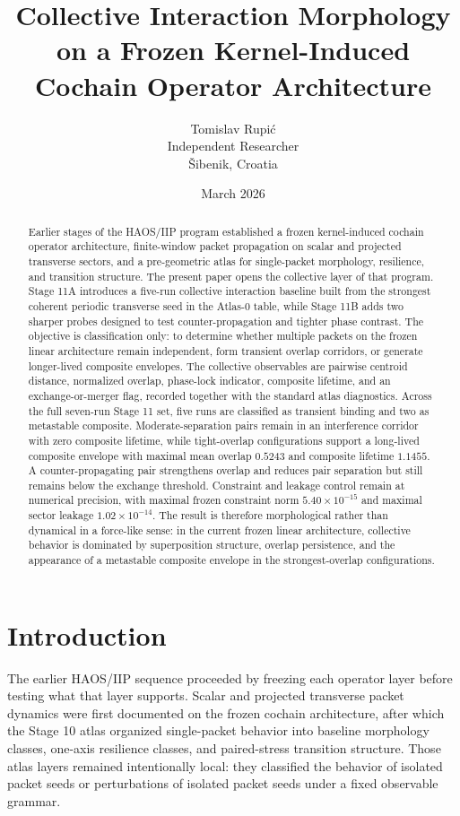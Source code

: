 \documentclass[11pt]{article}
\title{Collective Interaction Morphology on a Frozen Kernel-Induced Cochain Operator Architecture}
\author{Tomislav Rupi\'c\\Independent Researcher\\\v{S}ibenik, Croatia}
\date{March 2026}
\begin{document}
\maketitle

\begin{abstract}
Earlier stages of the HAOS/IIP program established a frozen kernel-induced cochain operator architecture, finite-window packet propagation on scalar and projected transverse sectors, and a pre-geometric atlas for single-packet morphology, resilience, and transition structure. The present paper opens the collective layer of that program. Stage 11A introduces a five-run collective interaction baseline built from the strongest coherent periodic transverse seed in the Atlas-0 table, while Stage 11B adds two sharper probes designed to test counter-propagation and tighter phase contrast. The objective is classification only: to determine whether multiple packets on the frozen linear architecture remain independent, form transient overlap corridors, or generate longer-lived composite envelopes. The collective observables are pairwise centroid distance, normalized overlap, phase-lock indicator, composite lifetime, and an exchange-or-merger flag, recorded together with the standard atlas diagnostics. Across the full seven-run Stage 11 set, five runs are classified as transient binding and two as metastable composite. Moderate-separation pairs remain in an interference corridor with zero composite lifetime, while tight-overlap configurations support a long-lived composite envelope with maximal mean overlap $0.5243$ and composite lifetime $1.1455$. A counter-propagating pair strengthens overlap and reduces pair separation but still remains below the exchange threshold. Constraint and leakage control remain at numerical precision, with maximal frozen constraint norm $5.40\times 10^{-15}$ and maximal sector leakage $1.02\times 10^{-14}$. The result is therefore morphological rather than dynamical in a force-like sense: in the current frozen linear architecture, collective behavior is dominated by superposition structure, overlap persistence, and the appearance of a metastable composite envelope in the strongest-overlap configurations.
\end{abstract}

\section{Introduction}
The earlier HAOS/IIP sequence proceeded by freezing each operator layer before testing what that layer supports. Scalar and projected transverse packet dynamics were first documented on the frozen cochain architecture, after which the Stage 10 atlas organized single-packet behavior into baseline morphology classes, one-axis resilience classes, and paired-stress transition structure. Those atlas layers remained intentionally local: they classified the behavior of isolated packet seeds or perturbations of isolated packet seeds under a fixed observable grammar.
\end{document}
